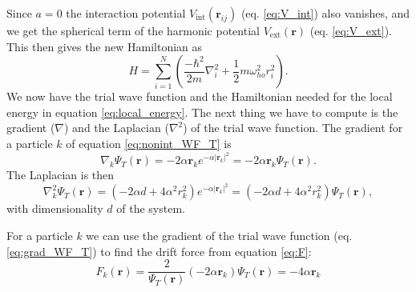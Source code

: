 \documentclass[12pt,a4paper,english]{article}
\begin{document}
Since $a=0$ the interaction potential $V_{\text{int}}(\textbf{r}_{ij})$ (eq. \ref{eq:V_int}) also vanishes, and we get the spherical term of the harmonic potential $V_{\text{ext}}(\textbf{r})$ (eq. \ref{eq:V_ext}). This then gives the new Hamiltonian as
\begin{equation}
\label{eq:non-int_H}
H=\sum_{i=1}^N\left(\frac{-\hbar^2}{2m}\nabla_i^2+\frac{1}{2}m\omega_{ho}^2r_i^2\right).
\end{equation}
We now have the trial wave function and the Hamiltonian needed for the local energy in equation \ref{eq:local_energy}. The next thing we have to compute is the gradient ($\nabla$) and the Laplacian ($\nabla^2$) of the trial wave function. The gradient for a particle $k$ of equation \ref{eq:nonint_WF_T} is
\begin{equation}
\label{eq:grad_WF_T}
\nabla_k\Psi_T(\textbf{r})=-2\alpha \textbf{r}_ke^{-\alpha|\textbf{r}_k|^2}=-2\alpha \textbf{r}_k\Psi_T(\textbf{r}).
\end{equation} 
The Laplacian is then
\begin{equation}
\label{eq:Laplacian_WF_T}
\nabla_k^2\Psi_T(\textbf{r})=(-2\alpha d+4\alpha^2r_k^2)e^{-\alpha|\textbf{r}_k|^2}=(-2\alpha d+4\alpha^2r_k^2)\Psi_T(\textbf{r}),
\end{equation}
with dimensionality $d$ of the system.

For a particle $k$ we can use the gradient of the trial wave function (eq. \ref{eq:grad_WF_T}) to find the drift force from equation \ref{eq:F}:
\begin{equation}
\label{eq:Drift_F_nonint}
F_k(\textbf{r})=\frac{2}{\Psi_T(\textbf{r})}(-2\alpha \textbf{r}_k)\Psi_T(\textbf{r})=-4\alpha\textbf{r}_k
\end{equation}
\end{document}
